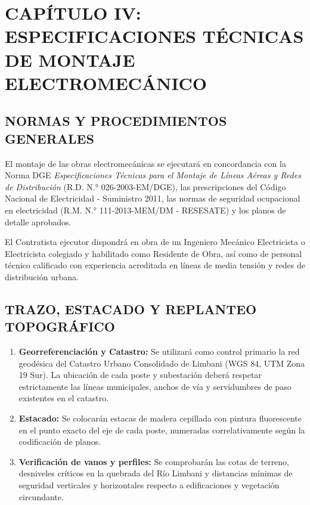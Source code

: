 \chapter*{CAPÍTULO IV: ESPECIFICACIONES TÉCNICAS DE MONTAJE ELECTROMECÁNICO}

\section{NORMAS Y PROCEDIMIENTOS GENERALES}

El montaje de las obras electromecánicas se ejecutará en concordancia con la Norma DGE \textit{Especificaciones Técnicas para el Montaje de Líneas Aéreas y Redes de Distribución} (R.D. N.° 026-2003-EM/DGE), las prescripciones del Código Nacional de Electricidad - Suministro 2011, las normas de seguridad ocupacional en electricidad (R.M. N.° 111-2013-MEM/DM - RESESATE) y los planos de detalle aprobados.

El Contratista ejecutor dispondrá en obra de un Ingeniero Mecánico Electricista o Electricista colegiado y habilitado como Residente de Obra, así como de personal técnico calificado con experiencia acreditada en líneas de media tensión y redes de distribución urbana.

\section{TRAZO, ESTACADO Y REPLANTEO TOPOGRÁFICO}

\begin{enumerate}
  \item \textbf{Georreferenciación y Catastro:} Se utilizará como control primario la red geodésica del Catastro Urbano Consolidado de Limbani (WGS 84, UTM Zona 19 Sur). La ubicación de cada poste y subestación deberá respetar estrictamente las líneas municipales, anchos de vía y servidumbres de paso existentes en el catastro.
  \item \textbf{Estacado:} Se colocarán estacas de madera cepillada con pintura fluorescente en el punto exacto del eje de cada poste, numeradas correlativamente según la codificación de planos.
  \item \textbf{Verificación de vanos y perfiles:} Se comprobarán las cotas de terreno, desniveles críticos en la quebrada del Río Limbani y distancias mínimas de seguridad verticales y horizontales respecto a edificaciones y vegetación circundante.
\end{enumerate}

